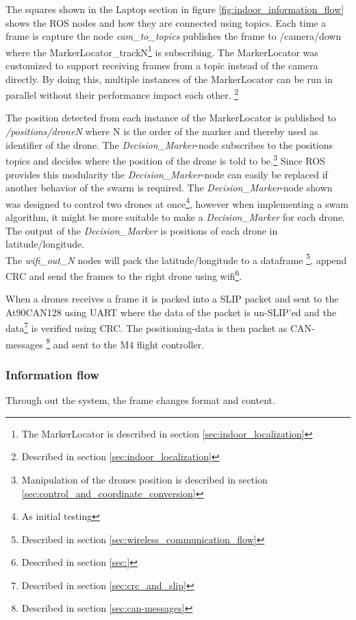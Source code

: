 The squares shown in the Laptop section in figure \ref{fig:indoor_information_flow} shows the ROS nodes and how they are connected using topics. 
Each time a frame is capture the node \textit{cam\_to\_topics} publishes the frame to /camera/down where the MarkerLocator\_trackN\footnote{The MarkerLocator is described in section \ref{sec:indoor_localization}} is subscribing. The MarkerLocator was customized to support receiving frames from a topic instead of the camera directly. By doing this, multiple instances of the MarkerLocator can be run in parallel without their performance impact each other. \footnote{Described in section \ref{sec:indoor_localization}}

The position detected from each instance of the MarkerLocator is published to \textit{/positions/droneN} where N is the order of the marker and thereby used as identifier of the drone. 
The \textit{Decision\_Marker}-node subscribes to the positions topics and decides where the position of the drone is told to be.\footnote{Manipulation of the drones position is described in section \ref{sec:control_and_coordinate_conversion}}
Since ROS provides this modularity the \textit{Decision\_Marker}-node can easily be replaced if another behavior of the swarm is required.
The \textit{Decision\_Marker}-node shown was designed to control two drones at once\footnote{As initial testing}, however when implementing a swam algorithm, it might be more suitable to make a \textit{Decision\_Marker} for each drone. The output of the \textit{Decision\_Marker} is positions of each drone in latitude/longitude.\\
The \textit{wifi\_out\_N} nodes will pack the latitude/longitude to a dataframe \footnote{Described in section \ref{sec:wireless_communication_flow}}, append CRC and send the frames to the right drone using wifi\footnote{Described in section \ref{sec:}}. \

When a drones receives a frame it is packed into a SLIP packet and sent to the At90CAN128 using UART where the data of the packet is un-SLIP'ed and the data\footnote{Described in section \ref{sec:crc_and_slip}} is verified using CRC. The positioning-data is then packet as CAN-messages \footnote{Described in section \ref{sec:can-messages}} and sent to the M4 flight controller.

\subsubsection*{Information flow}
Through out the system, the frame changes format and content.

